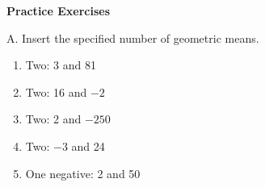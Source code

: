 \textbf{Practice Exercises}

\vspce

A. Insert the specified number of geometric means.   

\begin{enumerate}[label = \arabic*. ]


	\item \hspce Two: 3 and 81
	\item \hspce Two: 16 and $-2$ 
	\item \hspce Two: 2 and $-250$ 
	\item \hspce Two: $-3$ and 24
	\item \hspce One negative: 2 and 50 
	

\end{enumerate}